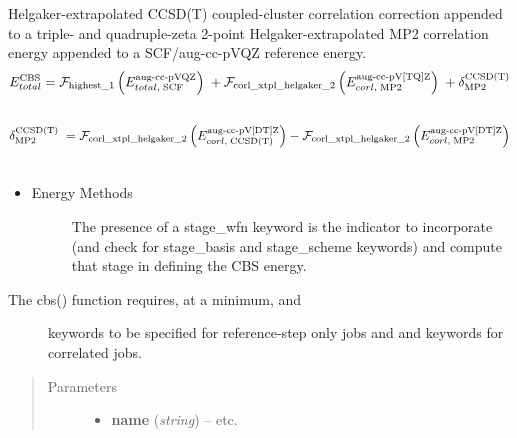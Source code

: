 \documentclass[letterpaper,10pt,english]{sphinxmanual}
\begin{document}
\begin{fulllineitems}
Helgaker-extrapolated CCSD(T) coupled-cluster correlation correction
appended to a triple- and quadruple-zeta 2-point
Helgaker-extrapolated MP2 correlation energy appended to a SCF/aug-cc-pVQZ
reference energy.
\begin{gather}
\begin{split}E_{total}^{\text{CBS}} = \mathcal{F}_{\text{highest\_1}} \left(E_{total,\; \text{SCF}}^{\text{aug-cc-pVQZ}}\right) \; + \mathcal{F}_{\text{corl\_xtpl\_helgaker\_2}} \left(E_{corl,\; \text{MP2}}^{\text{aug-cc-pV[TQ]Z}}\right) \; + \delta_{\text{MP2}}^{\text{CCSD(T)}}\end{split}\notag\\\begin{split}\end{split}\notag
\end{gather}\begin{gather}
\begin{split}\delta_{\text{MP2}}^{\text{CCSD(T)}} \; = \mathcal{F}_{\text{corl\_xtpl\_helgaker\_2}} \left(E_{corl,\; \text{CCSD(T)}}^{\text{aug-cc-pV[DT]Z}}\right) - \mathcal{F}_{\text{corl\_xtpl\_helgaker\_2}} \left(E_{corl,\; \text{MP2}}^{\text{aug-cc-pV[DT]Z}}\right)\end{split}\notag\\\begin{split}\end{split}\notag
\end{gather}\begin{itemize}
\item {} \begin{description}
\item[{Energy Methods}] \leavevmode
The presence of a stage\_wfn keyword is the indicator to incorporate
(and check for stage\_basis and stage\_scheme keywords) and compute
that stage in defining the CBS energy.

\end{description}

\end{itemize}
\begin{description}
\item[{The cbs() function requires, at a minimum,  and }] \leavevmode
keywords to be specified for reference-step only jobs and  and
 keywords for correlated jobs.

\end{description}
\begin{quote}\begin{description}
\item[{Parameters}] \leavevmode\begin{itemize}
\item {} 
\textbf{name} (\emph{string}) -- 
 \textbar{}\textbar{}  \textbar{}\textbar{} etc.


\end{itemize}
\end{description}
\end{quote}
\end{fulllineitems}
\end{document}
